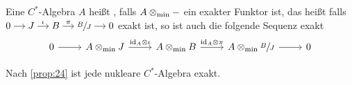 \begin{definition}[{name=[exakte C^*-Algebra]}]
	Eine $C^*$-Algebra $A$ heißt , falls $A \mathbin{\otimes_{\min}} -$ ein exakter Funktor ist, das heißt falls \(
		\begin{tikzcd}[cramped,sep=small]
			0 \rar & J \rar["\iota"] & B \rar["\pi"] & \sfrac{B}{J} \rar & 0
		\end{tikzcd}
	\)
	exakt ist, so ist auch die folgende Sequenz exakt
	\[
		\begin{tikzcd}
			0 \rar & A \tensormin J \rar["{\id_A} \otimes \iota"] & A \tensormin B \rar["{\id_A} \otimes \pi"] & A \tensormin \sfrac{B}{J} \rar & 0
		\end{tikzcd}
	\]
\end{definition}

\begin{bemerkung}[{name=[{nukleare $C^*$-Algebren sind exakt}]}]
	Nach \autoref{prop:24} ist jede nukleare $C^*$-Algebra exakt.
\end{bemerkung}

